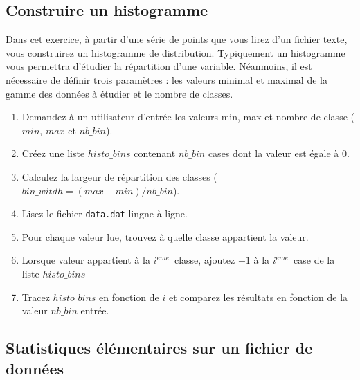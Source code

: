 


\subsection{Construire un histogramme}

Dans cet exercice, à partir d'une série de points que vous lirez d'un fichier texte, vous construirez un histogramme de distribution.
Typiquement un histogramme vous permettra d'étudier la répartition d'une variable.
Néanmoins, il est nécessaire de définir trois paramètres : les valeurs minimal et maximal de la gamme des données à étudier et
le nombre de classes.
\begin{enumerate}
\item Demandez à un utilisateur d'entrée les valeurs min, max et nombre de classe ($min$, $max$ et $nb\_bin$).
\item Créez une liste $histo\_bins$  contenant $nb\_bin$ cases dont la valeur est égale à 0.
\item Calculez la largeur de répartition des classes ($bin\_witdh = (max - min) / nb\_bin$).
\item Lisez le fichier \texttt{data.dat} lingne à ligne.
\item Pour chaque valeur lue, trouvez à quelle classe appartient la valeur.
\item Lorsque valeur appartient à la $i^{eme}$~classe, ajoutez $+1$ à la  $i^{eme}$~case de la liste  $histo\_bins$
\item Tracez $histo\_bins$ en fonction de $i$ et comparez les résultats en fonction de la valeur  $nb\_bin$ entrée.
\end{enumerate}



\subsection{Statistiques élémentaires sur un fichier de données}

